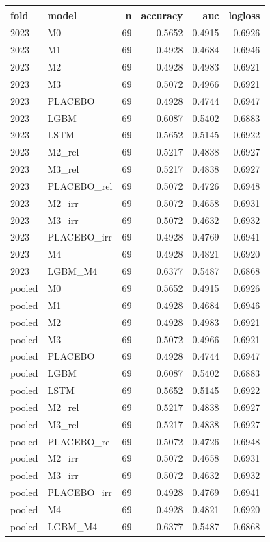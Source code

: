 \begin{tabular}{llrrrr}
\toprule
fold & model & n & accuracy & auc & logloss \\
\midrule
2023 & M0 & 69 & 0.5652 & 0.4915 & 0.6926 \\
2023 & M1 & 69 & 0.4928 & 0.4684 & 0.6946 \\
2023 & M2 & 69 & 0.4928 & 0.4983 & 0.6921 \\
2023 & M3 & 69 & 0.5072 & 0.4966 & 0.6921 \\
2023 & PLACEBO & 69 & 0.4928 & 0.4744 & 0.6947 \\
2023 & LGBM & 69 & 0.6087 & 0.5402 & 0.6883 \\
2023 & LSTM & 69 & 0.5652 & 0.5145 & 0.6922 \\
2023 & M2\_rel & 69 & 0.5217 & 0.4838 & 0.6927 \\
2023 & M3\_rel & 69 & 0.5217 & 0.4838 & 0.6927 \\
2023 & PLACEBO\_rel & 69 & 0.5072 & 0.4726 & 0.6948 \\
2023 & M2\_irr & 69 & 0.5072 & 0.4658 & 0.6931 \\
2023 & M3\_irr & 69 & 0.5072 & 0.4632 & 0.6932 \\
2023 & PLACEBO\_irr & 69 & 0.4928 & 0.4769 & 0.6941 \\
2023 & M4 & 69 & 0.4928 & 0.4821 & 0.6920 \\
2023 & LGBM\_M4 & 69 & 0.6377 & 0.5487 & 0.6868 \\
pooled & M0 & 69 & 0.5652 & 0.4915 & 0.6926 \\
pooled & M1 & 69 & 0.4928 & 0.4684 & 0.6946 \\
pooled & M2 & 69 & 0.4928 & 0.4983 & 0.6921 \\
pooled & M3 & 69 & 0.5072 & 0.4966 & 0.6921 \\
pooled & PLACEBO & 69 & 0.4928 & 0.4744 & 0.6947 \\
pooled & LGBM & 69 & 0.6087 & 0.5402 & 0.6883 \\
pooled & LSTM & 69 & 0.5652 & 0.5145 & 0.6922 \\
pooled & M2\_rel & 69 & 0.5217 & 0.4838 & 0.6927 \\
pooled & M3\_rel & 69 & 0.5217 & 0.4838 & 0.6927 \\
pooled & PLACEBO\_rel & 69 & 0.5072 & 0.4726 & 0.6948 \\
pooled & M2\_irr & 69 & 0.5072 & 0.4658 & 0.6931 \\
pooled & M3\_irr & 69 & 0.5072 & 0.4632 & 0.6932 \\
pooled & PLACEBO\_irr & 69 & 0.4928 & 0.4769 & 0.6941 \\
pooled & M4 & 69 & 0.4928 & 0.4821 & 0.6920 \\
pooled & LGBM\_M4 & 69 & 0.6377 & 0.5487 & 0.6868 \\
\bottomrule
\end{tabular}
